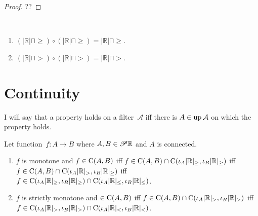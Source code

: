 \begin{proof}
??
\end{proof}

\begin{conjecture}
~
\begin{enumerate}
\item $(|\mathbb{R}| \sqcap {\geq}) \circ (|\mathbb{R}| \sqcap {\geq}) = |\mathbb{R}| \sqcap {\geq}$.
\item $(|\mathbb{R}| \sqcap {>}) \circ (|\mathbb{R}| \sqcap {>}) = |\mathbb{R}| \sqcap {>}$.
\end{enumerate}
\end{conjecture}

\section{Continuity}

I will say that a property holds on a filter~$\mathcal{A}$ iff there is $A\in\operatorname{up}\mathcal{A}$ on which the property holds.


\begin{lem}
Let function~$f:A\rightarrow B$ where $A,B\in\mathscr{P}\mathbb{R}$ and $A$ is connected.
\begin{enumerate}
\item $f$ is monotone and $f\in\mathrm{C}(A,B)$ iff
$f\in\mathrm{C}(A,B)\cap\mathrm{C}(\iota_A|\mathbb{R}|_{\geq},\iota_B|\mathbb{R}|_{\geq})$ iff
$f\in\mathrm{C}(A,B)\cap\mathrm{C}(\iota_A|\mathbb{R}|_{>},\iota_B|\mathbb{R}|_{\geq})$ iff
$f\in\mathrm{C}(\iota_A|\mathbb{R}|_{\geq},\iota_B|\mathbb{R}|_{\geq})\cap
\mathrm{C}(\iota_A|\mathbb{R}|_{\leq},\iota_B|\mathbb{R}|_{\leq})$.
\item $f$ is strictly monotone and $\in\mathrm{C}(A,B)$ iff
$f\in\mathrm{C}(A,B)\cap\mathrm{C}(\iota_A|\mathbb{R}|_{>},\iota_B|\mathbb{R}|_{>})$ iff
$f\in\mathrm{C}(\iota_A|\mathbb{R}|_{>},\iota_B|\mathbb{R}|_{>})\cap
\mathrm{C}(\iota_A|\mathbb{R}|_{<},\iota_B|\mathbb{R}|_{<})$.
\end{enumerate}
\end{lem}

